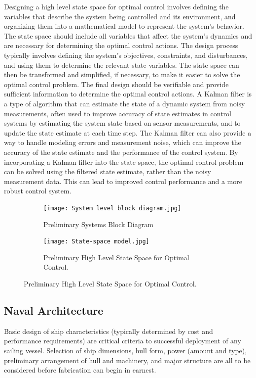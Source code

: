 \documentclass{article}
\begin{document}
Designing a high level state space for optimal control involves defining the variables that describe the system being controlled and its environment, and organizing them into a mathematical model to represent the system's behavior. The state space should include all variables that affect the system's dynamics and are necessary for determining the optimal control actions. The design process typically involves defining the system's objectives, constraints, and disturbances, and using them to determine the relevant state variables. The state space can then be transformed and simplified, if necessary, to make it easier to solve the optimal control problem. The final design should be verifiable and provide sufficient information to determine the optimal control actions. A Kalman filter is a type of algorithm that can estimate the state of a dynamic system from noisy measurements, often used to improve accuracy of state estimates in control systems by estimating the system state based on sensor measurements, and to update the state estimate at each time step. The Kalman filter can also provide a way to handle modeling errors and measurement noise, which can improve the accuracy of the state estimate and the performance of the control system. By incorporating a Kalman filter into the state space, the optimal control problem can be solved using the filtered state estimate, rather than the noisy measurement data. This can lead to improved control performance and a more robust control system.
    \begin{figure}[h]
        \begin{subfigure}{\textwidth}
            \centering
            \texttt{[image: System level block diagram.jpg]}
            \caption{Preliminary Systems Block Diagram}
            \label{fig:subim2}
        \end{subfigure}
        \begin{subfigure}{\textwidth}
            \centering
            \texttt{[image: State-space model.jpg]}
            \caption{Preliminary High Level State Space for Optimal Control. }
        \end{subfigure}
    
    \end{figure}

        
\subsection{Naval Architecture}
Basic design of ship characteristics (typically determined by cost and performance requirements) are critical criteria to successful deployment of any sailing vessel. Selection of ship dimensions, hull form, power (amount and type), preliminary arrangement of hull and machinery, and major structure are all to be considered before fabrication can begin in earnest. 
\end{document}
